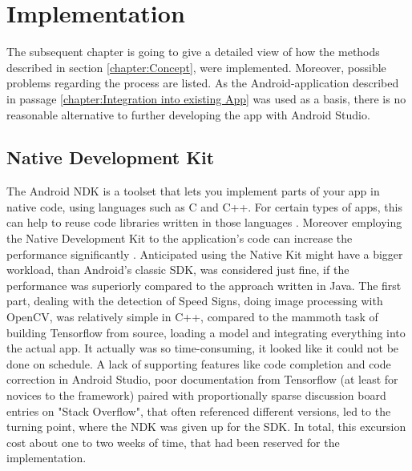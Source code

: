 

\chapter{Implementation}\label{chapter:Implementation}
The subsequent chapter is going to give a detailed view of how the methods described in section \ref{chapter:Concept}, were implemented. Moreover, possible problems regarding the process are listed. 
As the Android-application described in passage \ref{chapter:Integration into existing App} was used as a basis, there is no reasonable alternative to further developing the app with Android Studio.

\section{Native Development Kit}
The Android NDK is a toolset that lets you implement parts of your app in native code, using languages such as C and C++. For certain types of apps, this can help to reuse code libraries written in those languages \cite{androidndk}. Moreover employing the Native Development Kit to the application's code can increase the performance significantly  \cite{ndkspeed}. Anticipated using the Native Kit might have a bigger workload, than Android's classic SDK, was considered just fine, if the performance was superiorly compared to the approach written in Java. \newline
The first part, dealing with the detection of Speed Signs, doing image processing with OpenCV,  was relatively simple in C++, compared to the mammoth task of building Tensorflow from source, loading a model and integrating everything into the actual app. It actually was so time-consuming, it looked like it could not be done on schedule. A lack of supporting features like code completion and code correction in Android Studio, poor documentation from Tensorflow (at least for novices to the framework) paired with proportionally sparse discussion board entries on "Stack Overflow", that often referenced different versions, led to the turning point, where the NDK was given up for the SDK. In total, this excursion cost about one to two weeks of time, that had been reserved for the implementation. 

